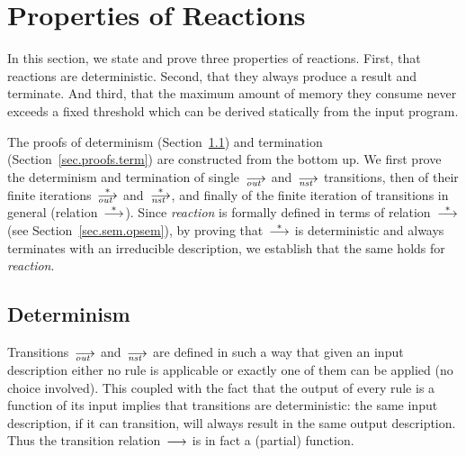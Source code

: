\section{Properties of \CEU Reactions}
\label{sec.proofs}

In this section, we state and prove three properties of \CEU reactions.
First, that reactions are deterministic.  Second, that they always produce a
result and terminate. And third, that the maximum amount of memory they
consume never exceeds a fixed threshold which can be derived statically from
the input program.

The proofs of determinism (Section~\ref{sec.proofs.det}) and termination
(Section~\ref{sec.proofs.term}) are constructed from the bottom up.  We
first prove the determinism and termination of single~$\out$ and~$\nst$
transitions, then of their finite iterations~$\out[*]$ and~$\nst[*]$, and
finally of the finite iteration of transitions in general
(relation~$\trans[*]$).  Since \emph{reaction} is formally defined in terms
of relation~$\trans[*]$ (see Section~\ref{sec.sem.opsem}), by proving
that~$\trans[*]$ is deterministic and always terminates with an irreducible
description, we establish that the same holds for \emph{reaction}.





\subsection{Determinism}
\label{sec.proofs.det}

Transitions~$\out$ and~$\nst$ are defined in such a way that given an input
description either no rule is applicable or exactly one of them can be
applied (no choice involved).  This coupled with the fact that the output of
every rule is a function of its input implies that transitions are
deterministic: the same input description, if it can transition, will always
result in the same output description.  Thus the transition
relation~$\trans$ is in fact a (partial) function.


